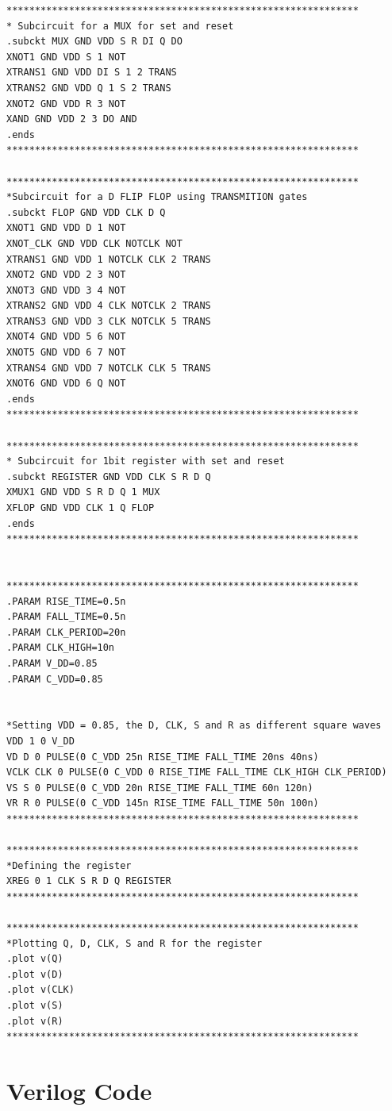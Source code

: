 \begin{lstlisting}[style=aimspiceStyle, caption=1-bit register in AIMSPICE, label=testcode]
**************************************************************
* Subcircuit for a MUX for set and reset
.subckt MUX GND VDD S R DI Q DO
XNOT1 GND VDD S 1 NOT
XTRANS1 GND VDD DI S 1 2 TRANS
XTRANS2 GND VDD Q 1 S 2 TRANS
XNOT2 GND VDD R 3 NOT
XAND GND VDD 2 3 DO AND
.ends 
**************************************************************

**************************************************************
*Subcircuit for a D FLIP FLOP using TRANSMITION gates 
.subckt FLOP GND VDD CLK D Q 
XNOT1 GND VDD D 1 NOT
XNOT_CLK GND VDD CLK NOTCLK NOT
XTRANS1 GND VDD 1 NOTCLK CLK 2 TRANS
XNOT2 GND VDD 2 3 NOT
XNOT3 GND VDD 3 4 NOT 
XTRANS2 GND VDD 4 CLK NOTCLK 2 TRANS
XTRANS3 GND VDD 3 CLK NOTCLK 5 TRANS
XNOT4 GND VDD 5 6 NOT
XNOT5 GND VDD 6 7 NOT
XTRANS4 GND VDD 7 NOTCLK CLK 5 TRANS
XNOT6 GND VDD 6 Q NOT
.ends
**************************************************************

**************************************************************
* Subcircuit for 1bit register with set and reset
.subckt REGISTER GND VDD CLK S R D Q 
XMUX1 GND VDD S R D Q 1 MUX
XFLOP GND VDD CLK 1 Q FLOP
.ends
**************************************************************


**************************************************************
.PARAM RISE_TIME=0.5n 
.PARAM FALL_TIME=0.5n 
.PARAM CLK_PERIOD=20n 
.PARAM CLK_HIGH=10n 
.PARAM V_DD=0.85
.PARAM C_VDD=0.85


*Setting VDD = 0.85, the D, CLK, S and R as different square waves
VDD 1 0 V_DD
VD D 0 PULSE(0 C_VDD 25n RISE_TIME FALL_TIME 20ns 40ns)
VCLK CLK 0 PULSE(0 C_VDD 0 RISE_TIME FALL_TIME CLK_HIGH CLK_PERIOD)
VS S 0 PULSE(0 C_VDD 20n RISE_TIME FALL_TIME 60n 120n)
VR R 0 PULSE(0 C_VDD 145n RISE_TIME FALL_TIME 50n 100n)
**************************************************************

**************************************************************
*Defining the register
XREG 0 1 CLK S R D Q REGISTER
**************************************************************

**************************************************************
*Plotting Q, D, CLK, S and R for the register
.plot v(Q)
.plot v(D)
.plot v(CLK)
.plot v(S) 
.plot v(R)
**************************************************************  

\end{lstlisting}


\section{Verilog Code}
\label{appendix:Verilog-code}

